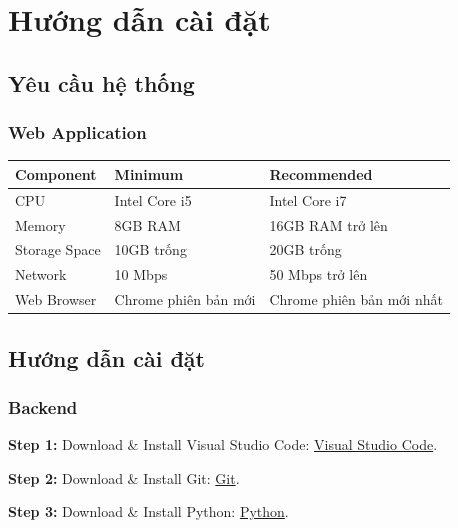 \section{Hướng dẫn cài đặt}

\subsection{Yêu cầu hệ thống}

\subsubsection{Web Application}

\begin{longtable}{|p{4cm}|p{5cm}|p{5cm}|}
	\hline
	\textbf{Component} & \textbf{Minimum} & \textbf{Recommended} \\
	\hline
	CPU & Intel Core i5 & Intel Core i7 \\
	\hline
	Memory & 8GB RAM & 16GB RAM trở lên \\
	\hline
	Storage Space & 10GB trống & 20GB trống \\
	\hline
	Network & 10 Mbps & 50 Mbps trở lên \\
	\hline
	Web Browser & Chrome phiên bản mới & Chrome phiên bản mới nhất \\
	\hline
\end{longtable}

\subsection{Hướng dẫn cài đặt}

\subsubsection{Backend}

\textbf{Step 1:} Download \& Install Visual Studio Code:
\href{https://code.visualstudio.com/download}{Visual Studio Code}.

\vspace{0.3cm}

\textbf{Step 2:} Download \& Install Git:
\href{https://git-scm.com/downloads}{Git}.

\vspace{0.3cm}

\textbf{Step 3:} Download \& Install Python:
\href{https://www.python.org/downloads/}{Python}.

\vspace{0.3cm}

